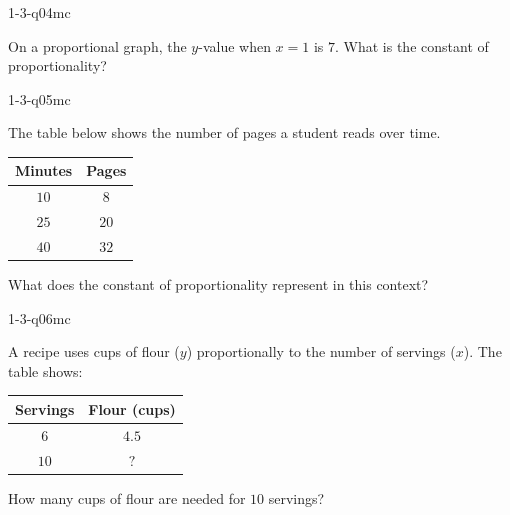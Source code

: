 \begin{practiceQuestion}{1-3-q04}{mc}
\begin{questionText}
On a proportional graph, the $y$-value when $x = 1$ is $7$. What is the constant of proportionality?
\end{questionText}
\end{practiceQuestion}

\begin{practiceQuestion}{1-3-q05}{mc}
\begin{questionText}
The table below shows the number of pages a student reads over time.

\begin{center}
\begin{tabular}{|c|c|}
\hline
\textbf{Minutes} & \textbf{Pages} \\
\hline
$10$ & $8$ \\
$25$ & $20$ \\
$40$ & $32$ \\
\hline
\end{tabular}
\end{center}

What does the constant of proportionality represent in this context?
\end{questionText}
\end{practiceQuestion}

\begin{practiceQuestion}{1-3-q06}{mc}
\begin{questionText}
A recipe uses cups of flour ($y$) proportionally to the number of servings ($x$). The table shows:

\begin{center}
\begin{tabular}{|c|c|}
\hline
\textbf{Servings} & \textbf{Flour (cups)} \\
\hline
$6$ & $4.5$ \\
$10$ & $?$ \\
\hline
\end{tabular}
\end{center}

How many cups of flour are needed for $10$ servings?
\end{questionText}
\end{practiceQuestion}

